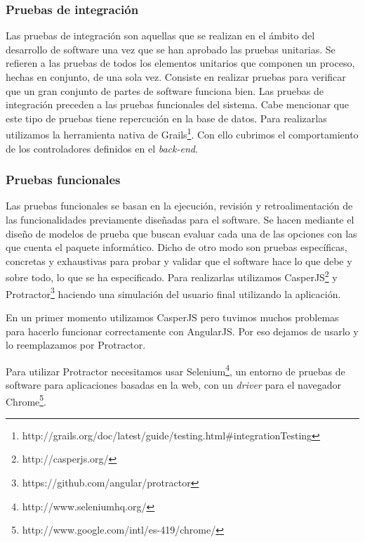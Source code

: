 \subsubsection{Pruebas de integración}
Las pruebas de integración son aquellas que se realizan en el ámbito del desarrollo de software una vez que se han aprobado las pruebas unitarias. Se refieren a las pruebas de todos los elementos unitarios que componen un proceso, hechas en conjunto, de una sola vez. Consiste en realizar pruebas para verificar que un gran conjunto de partes de software funciona bien. Las pruebas de integración preceden a las pruebas funcionales del sistema. Cabe mencionar que este tipo de pruebas tiene repercución en la base de datos. Para realizarlas utilizamos la herramienta nativa de Grails\footnote{http://grails.org/doc/latest/guide/testing.html\#integrationTesting}. Con ello cubrimos el comportamiento de los controladores definidos en el \textit{back-end}.

\subsubsection{Pruebas funcionales}
Las pruebas funcionales se basan en la ejecución, revisión y retroalimentación de las funcionalidades previamente diseñadas para el software. Se hacen mediante el diseño de modelos de prueba que buscan evaluar cada una de las opciones con las que cuenta el paquete informático. Dicho de otro modo son pruebas específicas, concretas y exhaustivas para probar y validar que el software hace lo que debe y sobre todo, lo que se ha especificado. Para realizarlas utilizamos CasperJS\footnote{http://casperjs.org/} y Protractor\footnote{https://github.com/angular/protractor} haciendo una simulación del usuario final utilizando la aplicación.

En un primer momento utilizamos CasperJS pero tuvimos muchos problemas para hacerlo funcionar correctamente con AngularJS. Por eso dejamos de usarlo y lo reemplazamos por Protractor.

Para utilizar Protractor necesitamos usar Selenium\footnote{http://www.seleniumhq.org/}, un entorno de pruebas de software para aplicaciones basadas en la web, con un \textit{driver} para el navegador  Chrome\footnote{http://www.google.com/intl/es-419/chrome/}.

